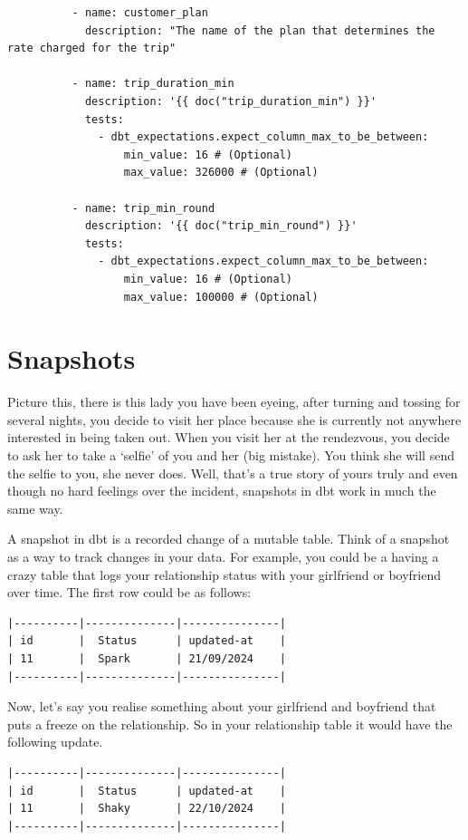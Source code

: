 \documentclass[
]{book}
\begin{document}
\begin{verbatim}
          - name: customer_plan
            description: "The name of the plan that determines the rate charged for the trip"

          - name: trip_duration_min
            description: '{{ doc("trip_duration_min") }}'
            tests:
              - dbt_expectations.expect_column_max_to_be_between:
                  min_value: 16 # (Optional)
                  max_value: 326000 # (Optional)

          - name: trip_min_round
            description: '{{ doc("trip_min_round") }}'
            tests:
              - dbt_expectations.expect_column_max_to_be_between:
                  min_value: 16 # (Optional)
                  max_value: 100000 # (Optional)
\end{verbatim}

\hypertarget{snapshots}{%
\chapter{Snapshots}\label{snapshots}}

Picture this, there is this lady you have been eyeing, after turning and tossing for several nights, you decide to visit her place because she is currently not anywhere interested in being taken out. When you visit her at the rendezvous, you decide to ask her to take a `selfie' of you and her (big mistake). You think she will send the selfie to you, she never does. Well, that's a true story of yours truly and even though no hard feelings over the incident, snapshots in dbt work in much the same way.

A snapshot in dbt is a recorded change of a mutable table. Think of a snapshot as a way to track changes in your data. For example, you could be a having a crazy table that logs your relationship status with your girlfriend or boyfriend over time. The first row could be as follows:

\begin{verbatim}
|----------|--------------|---------------|
| id       |  Status      | updated-at    |
| 11       |  Spark       | 21/09/2024    |
|----------|--------------|---------------|
\end{verbatim}

Now, let's say you realise something about your girlfriend and boyfriend that puts a freeze on the relationship. So in your relationship table it would have the following update.

\begin{verbatim}
|----------|--------------|---------------|
| id       |  Status      | updated-at    |
| 11       |  Shaky       | 22/10/2024    |
|----------|--------------|---------------|
\end{verbatim}
\end{document}
